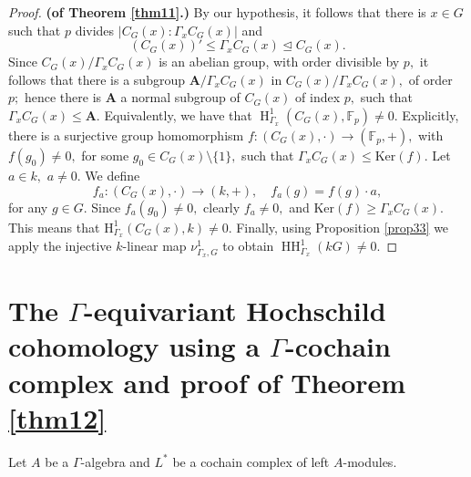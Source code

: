 \documentclass[pdflatex,sn-mathphys-num]{sn-jnl}
\numberwithin{equation}{section}
\theoremstyle{thmstyleone}
\theoremstyle{thmstyletwo}
\theoremstyle{thmstylethree}
\newcommand{\Hrm}{\operatorname{H}}
\newcommand{\HH}{\operatorname{HH}}
\begin{document}
\begin{proof}\textbf{(of Theorem \ref{thm11}.)}
 By our hypothesis, it follows that there is $x\in G$ such that $p$ divides $|C_G(x):\Gamma_xC_G(x)|$ and
$$(C_G(x))'\leq \Gamma_xC_G(x)\unlhd C_G(x).$$
Since $C_G(x)/\Gamma_xC_G(x)$ is an abelian group, with order divisible by $p,$ it follows that there is a subgroup $\mathbf{A}/\Gamma_xC_G(x)$ in
$C_G(x)/\Gamma_xC_G(x),$ of order $p;$ hence there is $\mathbf{A}$ a normal subgroup of $C_G(x)$ of index $p,$ such that $\Gamma_xC_G(x)\leq \mathbf{A}.$
Equivalently, we have that $\Hrm_{\Gamma_x}^1(C_G(x),\mathbb{F}_p)\neq 0.$
Explicitly, there is a surjective  group homomorphism $f:(C_G(x),\cdot)\rightarrow (\mathbb{F}_p,+),$ with $f(g_0)\neq 0,$ for some $g_0\in C_G(x)\setminus \{1\},$ such that
$\Gamma_xC_G(x)\leq \mathrm{Ker}(f).$ Let $a\in k,$ $a\neq 0.$ We define $$f_a: (C_G(x),\cdot)\rightarrow (k,+),\quad f_a(g)=f(g)\cdot a,$$ for any $g\in G.$ Since $f_a(g_0)\neq 0,$ clearly $f_a\neq 0,$ and $\mathrm{Ker}(f)\geq \Gamma_xC_G(x).$
This means that $\mathrm{H}_{\Gamma_x}^1(C_G(x),k)\neq 0.$
Finally, using Proposition \ref{prop33} we apply the injective $k$-linear map $\nu_{\Gamma_x,G}^1$  to obtain $\HH_{\Gamma_x}^1(kG)\neq 0.$
\end{proof}


\section{\texorpdfstring{The $\Gamma$-equivariant Hochschild cohomology using a $\Gamma$-cochain complex and proof of Theorem \ref{thm12}}{The Gamma-equivariant Hochschild cohomology using a Gamma-cochain complex and proof of Theorem 1.2}} \label{sec6}

Let $A$ be a $\Gamma$-algebra and $L^*$ be a cochain complex of left $A$-modules.
\end{document}
